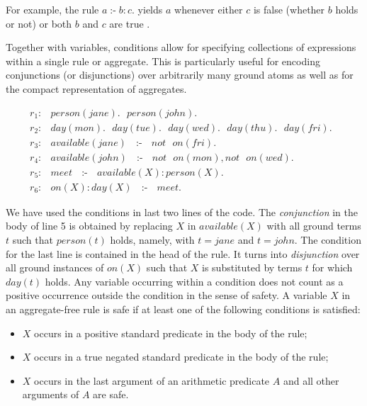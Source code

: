 \documentclass[14pt,a4paper, titlepage]{article}
\DeclareMathOperator{\leftimpl}{:-}
\begin{document}
For example, the rule $\mathit{a \leftimpl b : c.}$ yields $a$ whenever either $c$ is false (whether $b$ holds or not) or both $b$ and $c$ are true \cite{pott}.

Together  with variables, conditions allow for specifying collections of expressions within a single rule or aggregate. This is particularly useful for encoding conjunctions (or disjunctions) over arbitrarily many ground atoms as well as for the compact representation of aggregates. 
\begin{exmp}
\begin{align*}
r_1\colon& \mathit{person}(\mathit{jane}). \text{ } \mathit{person}(\mathit{john}).\\
r_2\colon& \mathit{day}(\mathit{mon}). \text{ } \mathit{day}(\mathit{tue}). \text{ } \mathit{day}(\mathit{wed}). \text{ } \mathit{day}(\mathit{thu}). \text{ } \mathit{day}(\mathit{fri}). \text{ }\\
r_3\colon& \mathit{available}(\mathit{jane}) \text{ } \leftimpl \text{ } not \text{ } \mathit{on}(\mathit{fri}).\\
r_4\colon& \mathit{available}(\mathit{john})\text{ } \leftimpl \text{ } \mathit{not} \text{ } \mathit{on}(\mathit{mon}), \mathit{not}  \text{ } \mathit{on}(\mathit{wed}).\\
r_5\colon& \mathit{meet} \text{ } \leftimpl \text{ } \mathit{available}(X) : \mathit{person}(X).\\
r_6\colon& \mathit{on}(X) : \mathit{day}(X) \text{ } \leftimpl \text{ } \mathit{meet}.
\end{align*}
\end{exmp}  
We have used the conditions in last two lines of the code. The \emph{conjunction} in the body of line 5 is obtained by replacing $X$ in $\mathit{available(X)}$ with all ground terms $t$ such that $\mathit{person(t)}$ holds, namely, with $\mathit{t=jane}$ and $\mathit{t=john}$. The condition for the last line is contained in the head of the rule. It turns into \emph{disjunction} over all ground instances of $\mathit{on(X)}$ such that $X$ is substituted by terms $t$ for which $\mathit{day(t)}$ holds. Any variable occurring within a condition does not count as a positive occurrence outside the condition in the sense of safety. A variable $X$ in an aggregate-free rule is safe if at least one of the following conditions is satisfied:
\begin{itemize}
\item $X$ occurs in a positive standard predicate in the body of the rule;
\item $X$ occurs in a true negated standard predicate in the body of the rule;
\item $X$ occurs in the last argument of an arithmetic predicate $A$ and all other arguments of $A$ are safe.
\end{itemize}
\end{document}
